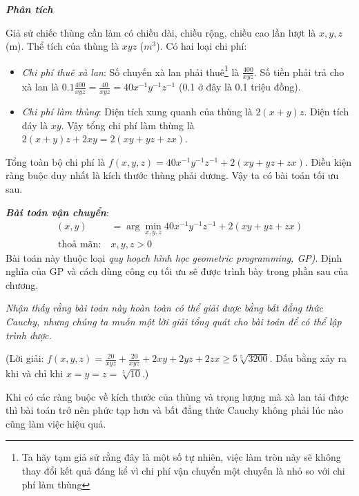 \textit{\textbf{Phân tích}}

Giả sử chiếc thùng cần làm có chiều dài, chiều rộng, chiều cao lần lượt là $x,
y, z$ (m). Thể tích của thùng là $xyz$ ($m^3$). Có hai loại chi phí:
\begin{itemize}
\item \textit{Chi phí thuê xà lan}: Số chuyến xà lan phải thuê\footnote{Ta
hãy tạm giả sử rằng đây là một số tự nhiên, việc làm tròn này sẽ không thay
đổi kết quả đáng kể vì chi phí vận chuyển một chuyến là nhỏ so với chi phí
làm thùng} là $\frac{400}{xyz}$. Số tiền phải trả cho xà lan là
$\displaystyle 0.1\frac{400}{xyz} = \frac{40}{xyz} = 40x^{-1}y^{-1}z^{-1}$
(0.1 ở đây là 0.1 triệu đồng).
\item \textit{Chi phí làm thùng}: Diện tích xung quanh của thùng là $2 (x +
y)z $. Diện tích đáy là $xy$. Vậy tổng chi phí làm thùng là $2(x +y)z + 2xy
= 2(xy + yz + zx)$.
\end{itemize}

Tổng toàn bộ chi phí là $f(x, y, z) = 40x^{-1}y^{-1}z^{-1} + 2(xy + yz + zx)$.
Điều kiện ràng buộc duy nhất là kích thước thùng phải dương. Vậy ta có
bài toán tối ưu sau.


\textit{\textbf{Bài toán vận chuyển}}:
\begin{equation}
\begin{aligned}
(x, y) &= \arg\min_{x, y, z} 40x^{-1}y^{-1}z^{-1} + 2(xy + yz + zx) \\\
\text{thoả mãn:}~ & x, y, z > 0
\end{aligned}
\end{equation}
Bài toán này thuộc loại \textit{quy hoạch hình học} \textit{{geometric programming, GP)}}. Định nghĩa của GP
và cách dùng công cụ tối ưu sẽ được trình bày trong phần sau của chương.

\textit{Nhận thấy rằng bài toán này hoàn toàn có thể giải được bằng bất
đẳng thức Cauchy, nhưng chúng ta muốn một lời giải tổng quát cho bài toán để có thể lập trình được.}

(Lời giải:
$f(x, y, z)= \frac{20}{xyz} + \frac{20}{xyz} + 2xy + 2yz + 2zx
\geq 5\sqrt[5]{3200} $.
Dấu bằng xảy ra khi và chỉ khi $x = y = z = \sqrt[5]{10}$.)

Khi có các ràng buộc về kích thước của thùng và trọng lượng mà xà lan tải được
thì bài toán trở nên phức tạp hơn và bất đẳng thức Cauchy không phải lúc nào cũng làm việc hiệu quả.

